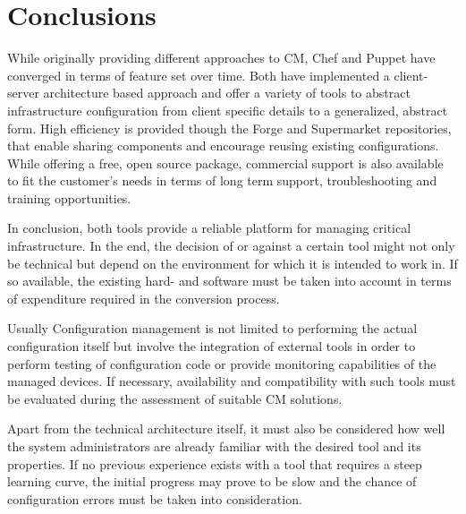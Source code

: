 \section{Conclusions}

While originally providing different approaches to CM, Chef and Puppet have converged in terms of feature set over time. Both have implemented a client-server architecture based approach and offer a variety of tools to abstract infrastructure configuration from client specific details to a generalized, abstract form. High efficiency is provided though the Forge and Supermarket repositories, that enable sharing components and encourage reusing existing configurations. While offering a free, open source package, commercial support is also available to fit the customer's needs in terms of long term support, troubleshooting and training opportunities.

In conclusion, both tools provide a reliable platform for managing critical infrastructure. In the end, the decision of or against a certain tool might not only be technical but depend on the environment for which it is intended to work in. If so available, the existing hard- and software must be taken into account in terms of expenditure required in the conversion process.

Usually Configuration management is not limited to performing the actual configuration itself but involve the integration of external tools in order to perform testing of configuration code or provide monitoring capabilities of the managed devices. If necessary, availability and compatibility with such tools must be evaluated during the assessment of suitable CM solutions.

Apart from the technical architecture itself, it must also be considered how well the system administrators are already familiar with the desired tool and its properties. If no previous experience exists with a tool that requires a steep learning curve, the initial progress may prove to be slow and the chance of configuration errors must be taken into consideration.